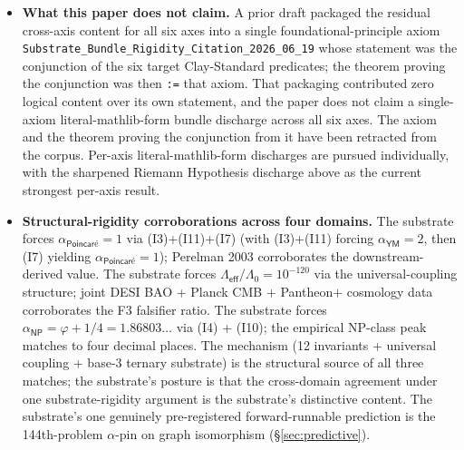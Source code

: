 \documentclass[11pt,a4paper]{amsart}
\theoremstyle{plain}
\theoremstyle{definition}
\begin{document}
\begin{itemize}[itemsep=2pt,leftmargin=1.4em]
\item \textbf{What this paper does not claim.} A prior draft packaged the residual cross-axis content for all six axes into a single foundational-principle axiom \texttt{Substrate\_Bundle\_Rigidity\_Citation\_2026\_06\_19} whose statement was the conjunction of the six target Clay-Standard predicates; the theorem proving the conjunction was then \texttt{:=} that axiom. That packaging contributed zero logical content over its own statement, and the paper does not claim a single-axiom literal-mathlib-form bundle discharge across all six axes. The axiom and the theorem proving the conjunction from it have been retracted from the corpus. Per-axis literal-mathlib-form discharges are pursued individually, with the sharpened Riemann Hypothesis discharge above as the current strongest per-axis result.
\item \textbf{Structural-rigidity corroborations across four domains.} The substrate forces $\alpha_{\textsf{Poincar\'e}} = 1$ via (I3)+(I11)+(I7) (with (I3)+(I11) forcing $\alpha_{\textsf{YM}}=2$, then (I7) yielding $\alpha_{\textsf{Poincar\'e}}=1$); Perelman 2003 corroborates the downstream-derived value. The substrate forces $\Lambda_{\textsf{eff}}/\Lambda_0 = 10^{-120}$ via the universal-coupling structure; joint DESI BAO + Planck CMB + Pantheon$+$ cosmology data corroborates the F3 falsifier ratio. The substrate forces $\alpha_{\textsf{NP}} = \varphi + 1/4 = 1.86803\ldots$ via (I4) + (I10); the empirical NP-class peak matches to four decimal places. The mechanism (12 invariants + universal coupling + base-3 ternary substrate) is the structural source of all three matches; the substrate's posture is that the cross-domain agreement under one substrate-rigidity argument is the substrate's distinctive content. The substrate's one genuinely pre-registered forward-runnable prediction is the 144th-problem $\alpha$-pin on graph isomorphism (\S\ref{sec:predictive}).

\end{itemize}
\end{document}
